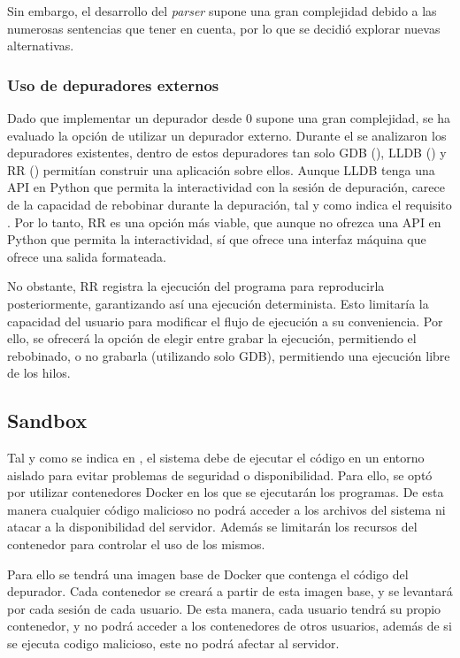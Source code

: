 Sin embargo, el desarrollo del \textit{\gls{parser}} supone una gran complejidad debido a las numerosas sentencias que tener en cuenta, por lo que se decidió explorar nuevas alternativas.

\subsubsection{Uso de depuradores externos} \label{sec:depuradores-externos}

Dado que implementar un depurador desde 0 supone una gran complejidad, se ha evaluado la opción de utilizar un depurador externo. Durante el  se analizaron los depuradores existentes, dentro de estos depuradores tan solo GDB (), LLDB () y RR () permitían construir una aplicación sobre ellos. Aunque LLDB tenga una API en Python que permita la interactividad con la sesión de depuración, carece de la capacidad de rebobinar durante la depuración, tal y como indica el requisito . Por lo tanto, RR es una opción más viable, que aunque no ofrezca una API en Python que permita la interactividad, sí que ofrece una interfaz máquina que ofrece una salida formateada.

No obstante, RR registra la ejecución del programa para reproducirla posteriormente, garantizando así una ejecución determinista. Esto limitaría la capacidad del usuario para modificar el flujo de ejecución a su conveniencia. Por ello, se ofrecerá la opción de elegir entre grabar la ejecución, permitiendo el rebobinado, o no grabarla (utilizando solo GDB), permitiendo una ejecución libre de los hilos.

\subsection{Sandbox} \label{sec:sandbox}

Tal y como se indica en , el sistema debe de ejecutar el código en un entorno aislado para evitar problemas de seguridad o disponibilidad. Para ello, se optó por utilizar contenedores Docker en los que se ejecutarán los programas. De esta manera cualquier código malicioso no podrá acceder a los archivos del sistema ni atacar a la disponibilidad del servidor. Además se limitarán los recursos del contenedor para controlar el uso de los mismos.

Para ello se tendrá una imagen base de Docker que contenga el código del depurador. Cada contenedor se creará a partir de esta imagen base, y se levantará por cada sesión de cada usuario. De esta manera, cada usuario tendrá su propio contenedor, y no podrá acceder a los contenedores de otros usuarios, además de si se ejecuta codigo malicioso, este no podrá afectar al servidor. 


